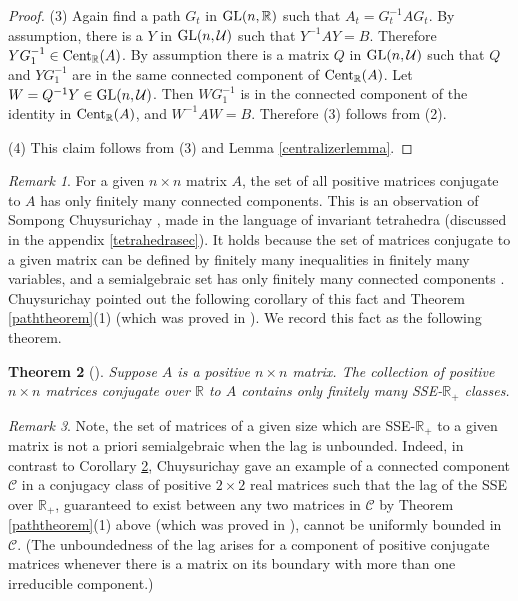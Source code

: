 \documentclass{amsart}
\newtheorem{theorem}{Theorem}[section]
\theoremstyle{definition}
\theoremstyle{remark}
\newtheorem{remark}[theorem]{Remark}
\numberwithin{equation}{section}
\begin{document}
{{\begin{proof}
(3) Again find a path $G_t$ in $\textnormal{GL}(n, \mathbb R)$ such that 
$A_t=G_t^{-1}AG_t$. By assumption, there is a $Y$ in $\textnormal{GL}(n, \mathcal U)$ 
such that $Y^{-1}AY=B$. Therefore $YG_1^{-1}\in 
\textnormal{Cent}_{\mathbb R} (A) $. By assumption 
 there is a matrix $Q$ 
in $\textnormal{GL}(n, \mathcal U)$ such that $Q$ and $YG_1^{-1}$ 
are in the same 
connected component of $ \textnormal{Cent}_{\mathbb R} (A) $. 
Let $W=Q^{-1}Y\in \textnormal{GL}(n,\mathcal U)$. 
Then $WG_1^{-1}$ is in the connected component 
of the identity in $ \textnormal{Cent}_{\mathbb R} (A) $, 
and $W^{-1}AW=B$. Therefore (3) follows from (2). 

(4) 
This claim follows from (3) and 
Lemma \ref{centralizerlemma}.
\end{proof} 


\begin{remark}\label{finitelymanycomponents}
 For a given  $n\times n$ matrix 
$A$, the set of all positive matrices conjugate to $A$ 
has only finitely many connected components. This is 
an observation of Sompong  Chuysurichay 
\cite[Theorem 1.4.2]{Ch},  
made in the language of 
invariant tetrahedra (discussed in the appendix \ref{tetrahedrasec}).
It holds because  the set of matrices conjugate to a given matrix 
can be defined by finitely many inequalities in finitely 
many variables,
and  a semialgebraic set has only finitely many connected 
components \cite[Theorem 2.4.4]{BCR98}.
Chuysurichay
\cite[Introduction]{Ch} 
 pointed out the following corollary of this 
fact and Theorem \ref{paththeorem}(1) (which was proved in 
\cite{KR2}). We record this fact as the following theorem.  
\end{remark} 

\begin{theorem}[\cite{Ch,KR2}]\label{finitesse}  Suppose $A$ is a positive $n\times n$ 
matrix. The collection of positive $n\times n$ matrices 
conjugate over $\mathbb R$ to $A$ contains  only finitely many 
SSE-$\mathbb R_+$ classes. 
\end{theorem} 

\begin{remark} \label{unboundedlag} 
Note, the set of matrices  of a given size which are 
 SSE-$\mathbb R_+$  to a given matrix is not a priori 
semialgebraic when the lag is unbounded. Indeed, 
in contrast to Corollary \ref{finitesse}, 
Chuysurichay 
gave an example
\cite[Theorem 1.9.1]{Ch} 
 of a connected 
component $\mathcal C$ in a conjugacy class of  
 positive $2\times 2$ real matrices 
such that the lag of the SSE over $\mathbb R_+$, guaranteed to 
exist between any two  matrices in $\mathcal C$  
by Theorem \ref{paththeorem}(1) above
 (which was proved in \cite{KR2}),  cannot be uniformly bounded 
in $\mathcal C$. (The unboundedness of the lag 
arises for a component of positive conjugate matrices 
whenever there is a matrix on its boundary with more 
than one irreducible component.) 


\end{remark}}}
\end{document}
